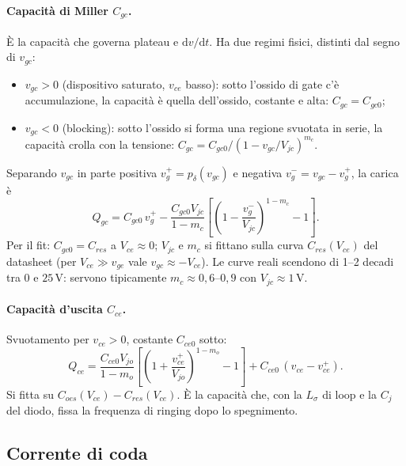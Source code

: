 \documentclass[11pt,a4paper]{article}
\newcommand{\ud}{\mathrm{d}}
\begin{document}
\paragraph{Capacit\`a di Miller $C_{gc}$.}
\`E la capacit\`a che governa plateau e $\ud v/\ud t$. Ha due regimi
fisici, distinti dal segno di $v_{gc}$:
\begin{itemize}
\item $v_{gc} > 0$ (dispositivo saturato, $v_{ce}$ basso): sotto
l'ossido di gate c'\`e accumulazione, la capacit\`a \`e quella
dell'ossido, costante e alta: $C_{gc} = C_{gc0}$;
\item $v_{gc} < 0$ (blocking): sotto l'ossido si forma una regione
svuotata in serie, la capacit\`a crolla con la tensione:
$C_{gc} = C_{gc0} / (1 - v_{gc}/V_{jc})^{m_c}$.
\end{itemize}
Separando $v_{gc}$ in parte positiva $v_g^{+} = p_\delta(v_{gc})$ e
negativa $v_g^{-} = v_{gc} - v_g^{+}$, la carica \`e
\begin{equation}
Q_{gc} = C_{gc0}\, v_g^{+}
- \frac{C_{gc0} V_{jc}}{1-m_c}
\left[ \left(1 - \frac{v_g^{-}}{V_{jc}}\right)^{1-m_c} - 1 \right].
\end{equation}
Per il fit: $C_{gc0} = C_{res}$ a $V_{ce} \approx 0$; $V_{jc}$ e $m_c$
si fittano sulla curva $C_{res}(V_{ce})$ del datasheet (per
$V_{ce} \gg v_{ge}$ vale $v_{gc} \approx -V_{ce}$). Le curve reali
scendono di 1--2 decadi tra $0$ e $25\,$V: servono tipicamente
$m_c \approx 0{,}6$--$0{,}9$ con $V_{jc} \approx 1\,$V.

\paragraph{Capacit\`a d'uscita $C_{ce}$.}
Svuotamento per $v_{ce} > 0$, costante $C_{ce0}$ sotto:
\begin{equation}
Q_{ce} = \frac{C_{ce0} V_{jo}}{1-m_o}
\left[ \left(1 + \frac{v_{ce}^{+}}{V_{jo}}\right)^{1-m_o} - 1 \right]
+ C_{ce0}\, (v_{ce} - v_{ce}^{+}).
\end{equation}
Si fitta su $C_{oes}(V_{ce}) - C_{res}(V_{ce})$. \`E la capacit\`a che,
con la $L_\sigma$ di loop e la $C_j$ del diodo, fissa la frequenza di
ringing dopo lo spegnimento.

\subsection{Corrente di coda}
\label{sec:tail}
\end{document}
